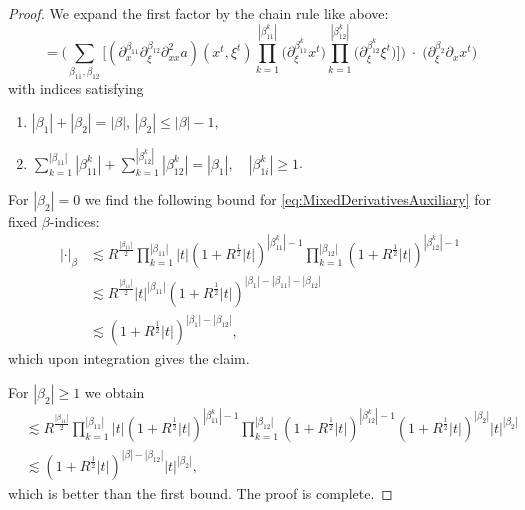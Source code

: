 \documentclass{amsart}
\theoremstyle{definition}
\begin{document}
\begin{proof}
We expand the first factor by the chain rule like above:
\begin{equation}
\label{eq:MixedDerivativesAuxiliary}
= \big( \sum_{\beta_{11},\beta_{12}} \big[ (\partial_x^{\beta_{11}} \partial_{\xi}^{\beta_{12}} \partial^2_{xx} a)(x^t,\xi^t) \prod_{k=1}^{|\beta_{11}^k|} \big( \partial_{\xi}^{\beta_{11}^k} x^t \big) \prod_{k=1}^{|\beta_{12}^k|} \big( \partial_{\xi}^{\beta_{12}^k} \xi^t \big) \big] \big) \; \cdot \; \big( \partial_{\xi}^{\beta_2} \partial_x x^t \big)
\end{equation}
with indices satisfying
\begin{enumerate}
\item $|\beta_1| + |\beta_2| = |\beta|$, $|\beta_2| \leq |\beta|-1$,
\item $\sum_{k=1}^{|\beta_{11}|} |\beta_{11}^k| + \sum_{k=1}^{|\beta_{12}^k|} |\beta_{12}^k| = |\beta_1|, \quad |\beta_{1i}^k| \geq 1$.
\end{enumerate}
For $|\beta_2| = 0$ we find the following bound for \eqref{eq:MixedDerivativesAuxiliary} for fixed $\beta$-indices:
\begin{equation*}
\begin{split}
| \cdot |_{\beta} &\lesssim R^{\frac{|\beta_{11}|}{2}} \prod_{k=1}^{|\beta_{11}|} |t| (1+ R^{\frac{1}{2}} |t|)^{|\beta_{11}^k| - 1} \prod_{k=1}^{|\beta_{12}|} (1+ R^{\frac{1}{2}} |t|)^{|\beta_{12}^k| - 1} \\
&\lesssim R^{\frac{|\beta_{11}|}{2}} |t|^{|\beta_{11}|} (1+R^{\frac{1}{2}} |t|)^{|\beta_1|-|\beta_{11}| -|\beta_{12}|} \\
&\lesssim (1+ R^{\frac{1}{2}} |t|)^{|\beta_1| - |\beta_{12}|},
\end{split}
\end{equation*}
which upon integration gives the claim.

For $|\beta_2| \geq 1$ we obtain
\begin{equation*}
\begin{split}
&\lesssim R^{\frac{|\beta_{11}|}{2}} \prod_{k=1}^{|\beta_{11}|} |t| ( 1+ R^{\frac{1}{2}} |t|)^{|\beta_{11}^k| - 1} \prod_{k=1}^{|\beta_{12}|} (1+R^{\frac{1}{2}} |t|)^{|\beta_{12}^k| - 1} (1+ R^{\frac{1}{2}} |t|)^{|\beta_2|} |t|^{|\beta_2|} \\
&\lesssim (1+ R^{\frac{1}{2}} |t|)^{|\beta| - |\beta_{12}|} |t|^{|\beta_2|},
\end{split}
\end{equation*}
which is better than the first bound. The proof is complete.
\end{proof}
\end{document}
